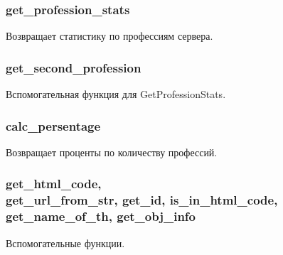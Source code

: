 \subsubsection{get\_profession\_stats}
Возвращает статистику по профессиям сервера.

\parindent=1cm

\subsubsection{get\_second\_profession}
Вспомогательная функция для GetProfessionStats.

\parindent=1cm

\newpage

\subsubsection{calc\_persentage}
Возвращает проценты по количеству профессий.

\parindent=1cm

\subsubsection{get\_html\_code,\\ get\_url\_from\_str, get\_id, is\_in\_html\_code,\\ get\_name\_of\_th, get\_obj\_info}
Вспомогательные функции.

\parindent=1cm


\parindent=1cm


\parindent=1cm


\parindent=1cm

\newpage


\parindent=1cm


\parindent=1cm


\parindent=1cm

